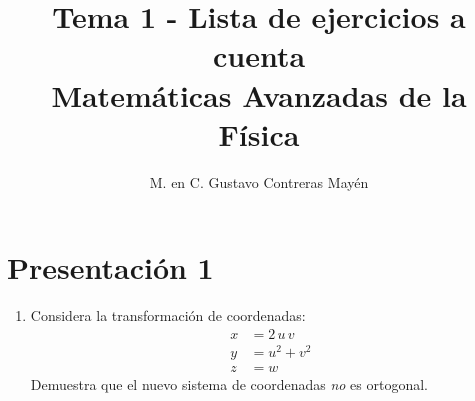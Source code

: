 
\title{Tema 1 - Lista de ejercicios a cuenta\\ \large{Matemáticas Avanzadas de la Física}\vspace{-3ex}}
\author{M. en C. Gustavo Contreras Mayén}
\date{ }

\vspace{-4cm}
\maketitle
\fontsize{14}{14}\selectfont
\section{Presentación 1}
\begin{enumerate}
\item Considera la transformación de coordenadas:
\begin{align*}
x &= 2 \, u \, v \\[0.5em]
y &= u^{2} + v^{2} \\[0.5em]
z &= w
\end{align*}
Demuestra que el nuevo sistema de coordenadas \emph{no} es ortogonal.
\end{enumerate}
